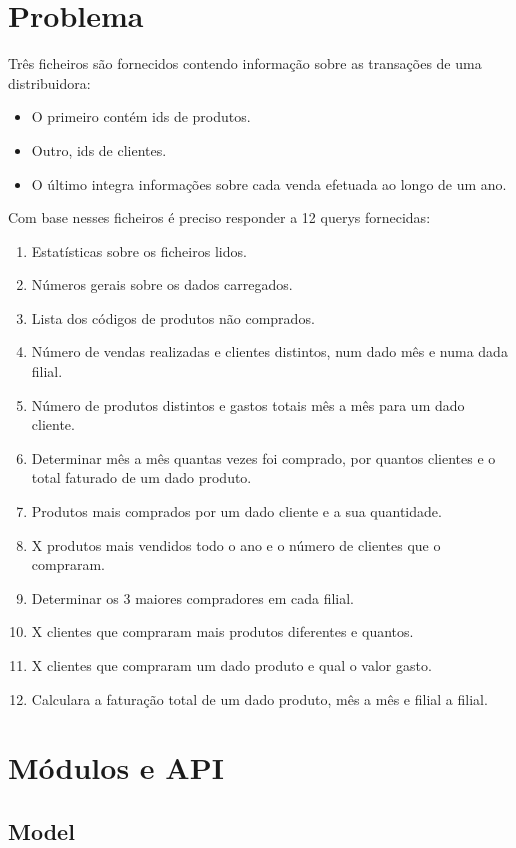 \documentclass[a4paper]{report}
\begin{document}
\chapter{Problema}
Três ficheiros são fornecidos contendo informação sobre as transações de uma distribuidora:
\begin{itemize}
    \item O primeiro contém ids de produtos.
    \item Outro, ids de clientes.
    \item O último integra informações sobre cada venda efetuada ao longo de um ano. 
\end{itemize}
Com base nesses ficheiros é preciso responder a 12 querys fornecidas:
\begin{enumerate}
    \item Estatísticas sobre os ficheiros lidos.
    \item Números gerais sobre os dados carregados.
    \item Lista dos códigos de produtos não comprados.
    \item Número de vendas realizadas e clientes distintos, num dado mês e numa dada filial.
    \item Número de produtos distintos e gastos totais mês a mês para um dado cliente.
    \item Determinar mês a mês quantas vezes foi comprado, por quantos clientes e o total faturado de um dado produto.
    \item Produtos mais comprados por um dado cliente e a sua quantidade.
    \item X produtos mais vendidos todo o ano e o número de clientes que o compraram.
    \item Determinar os 3 maiores compradores em cada filial.
    \item X clientes que compraram mais produtos diferentes e quantos.
    \item X clientes que compraram um dado produto e qual o valor gasto.
    \item Calculara a faturação total de um dado produto, mês a mês e filial a filial.
\end{enumerate}

\chapter{Módulos e API}\label{chap:api}

\section{Model}
\end{document}
